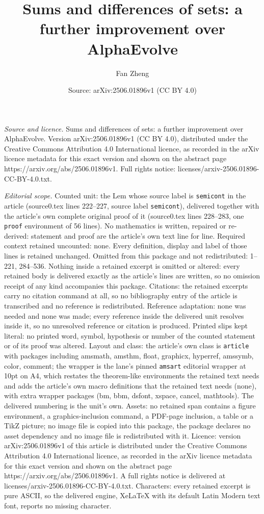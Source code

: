 \documentclass[10pt,a4paper]{amsart}
\title[Sums and differences of sets: a further improvement over Alp]{Sums and differences of sets: a further improvement over AlphaEvolve}
\author{Fan Zheng}
\date{Source: arXiv:2506.01896v1 (CC BY 4.0)}
\begin{document}
\maketitle

\noindent\emph{Source and licence.} Sums and differences of sets: a further improvement over AlphaEvolve. Version arXiv:2506.01896v1 (CC BY 4.0), distributed under the Creative Commons Attribution 4.0 International licence, as recorded in the arXiv licence metadata for this exact version and shown on the abstract page https://arxiv.org/abs/2506.01896v1. Full rights notice: licenses/arxiv-2506.01896-CC-BY-4.0.txt.\par\smallskip

\noindent\textit{Editorial scope.} Counted unit: the Lem whose source label is \texttt{semicont} in the article (source0.tex lines 222--227, source label \texttt{semicont}), delivered together with the article's own complete original proof of it (source0.tex lines 228--283, one \texttt{proof} environment of 56 lines). No mathematics is written, repaired or re-derived: statement and proof are the article's own text line for line. Required context retained uncounted: none. Every definition, display and label of those lines is retained unchanged. Omitted from this package and not redistributed: 1--221, 284--536. Nothing inside a retained excerpt is omitted or altered: every retained body is delivered exactly as the article's lines are written, so no omission receipt of any kind accompanies this package. Citations: the retained excerpts carry no citation command at all, so no bibliography entry of the article is transcribed and no reference is redistributed. Reference adaptation: none was needed and none was made; every reference inside the delivered unit resolves inside it, so no unresolved reference or citation is produced. Printed slips kept literal: no printed word, symbol, hypothesis or number of the counted statement or of its proof was altered. Layout and class: the article's own class is \texttt{article} with packages including amsmath, amsthm, float, graphicx, hyperref, amssymb, color, comment; the wrapper is the lane's pinned \texttt{amsart} editorial wrapper at 10pt on A4, which restates the theorem-like environments the retained text needs and adds the article's own macro definitions that the retained text needs (none), with extra wrapper packages (bm, bbm, dsfont, xspace, cancel, mathtools). The delivered numbering is the unit's own. Assets: no retained span contains a figure environment, a graphics-inclusion command, a PDF-page inclusion, a table or a TikZ picture; no image file is copied into this package, the package declares no asset dependency and no image file is redistributed with it. Licence: version arXiv:2506.01896v1 of this article is distributed under the Creative Commons Attribution 4.0 International licence, as recorded in the arXiv licence metadata for this exact version and shown on the abstract page https://arxiv.org/abs/2506.01896v1. A full rights notice is delivered at licenses/arxiv-2506.01896-CC-BY-4.0.txt. Characters: every retained excerpt is pure ASCII, so the delivered engine, XeLaTeX with its default Latin Modern text font, reports no missing character.
\end{document}
